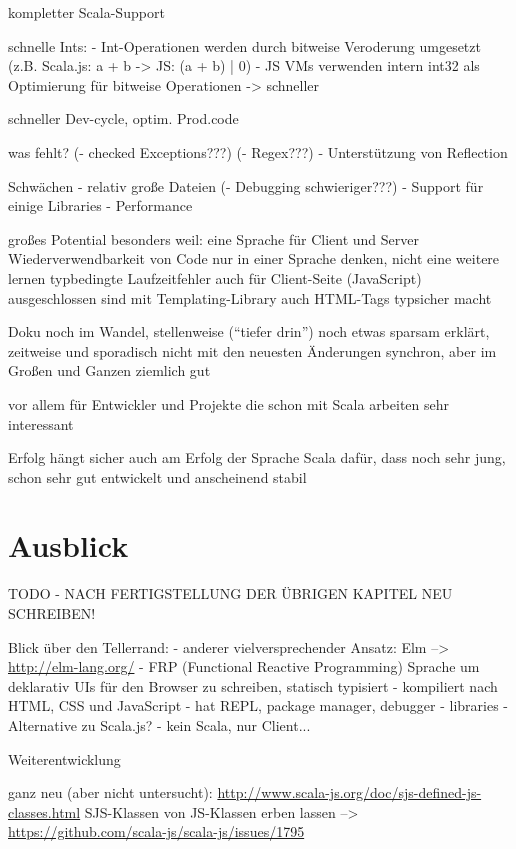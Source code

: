 \documentclass[a4paper, 12pt, listof=totoc, bibliography=totoc]{scrreprt}
\begin{document}
  kompletter Scala-Support
  
  schnelle Ints:
  - Int-Operationen werden durch bitweise Veroderung umgesetzt (z.B. Scala.js: a + b -> JS: (a + b) | 0)
  - JS VMs verwenden intern int32 als Optimierung für bitweise Operationen
  -> schneller\cite{doeraene2015.SSP}


  schneller Dev-cycle, optim. Prod.code
  
  
was fehlt?
  (- checked Exceptions???)
  (- Regex???)
  - Unterstützung von Reflection

Schwächen
  - relativ große Dateien
  (- Debugging schwieriger???)
  - Support für einige Libraries
  - Performance



großes Potential
	besonders weil: eine Sprache für Client und Server
		Wiederverwendbarkeit von Code
		nur in einer Sprache denken, nicht eine weitere lernen
	typbedingte Laufzeitfehler auch für Client-Seite (JavaScript) ausgeschlossen sind
	mit Templating-Library auch HTML-Tags typsicher macht
	
Doku noch im Wandel, stellenweise ("`tiefer drin"') noch etwas sparsam erklärt, zeitweise und sporadisch nicht mit den neuesten Änderungen synchron, aber im Großen und Ganzen ziemlich gut

vor allem für Entwickler und Projekte die schon mit Scala arbeiten sehr interessant

Erfolg hängt sicher auch am Erfolg der Sprache Scala
dafür, dass noch sehr jung, schon sehr gut entwickelt und anscheinend stabil





\section{Ausblick}

TODO - NACH FERTIGSTELLUNG DER ÜBRIGEN KAPITEL NEU SCHREIBEN!

Blick über den Tellerrand:
- anderer vielversprechender Ansatz: Elm
	-->  \url{http://elm-lang.org/}
	- FRP (Functional Reactive Programming) Sprache um deklarativ UIs für den Browser zu schreiben, statisch typisiert
	- kompiliert nach HTML, CSS und JavaScript
	- hat REPL, package manager, debugger
	- libraries
	- Alternative zu Scala.js? - kein Scala, nur Client...



Weiterentwicklung

	ganz neu (aber nicht untersucht): \url{http://www.scala-js.org/doc/sjs-defined-js-classes.html}
	SJS-Klassen von JS-Klassen erben lassen  -->  \url{https://github.com/scala-js/scala-js/issues/1795}
	
\end{document}
